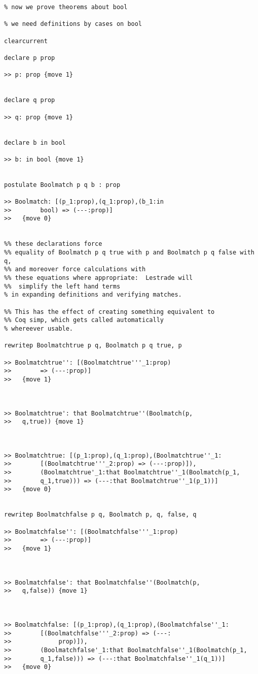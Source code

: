 \documentclass[12pt]{article}
\begin{document}
\begin{verbatim}
% now we prove theorems about bool

% we need definitions by cases on bool

clearcurrent

declare p prop

>> p: prop {move 1}


declare q prop

>> q: prop {move 1}


declare b in bool

>> b: in bool {move 1}


postulate Boolmatch p q b : prop

>> Boolmatch: [(p_1:prop),(q_1:prop),(b_1:in 
>>        bool) => (---:prop)]
>>   {move 0}


%% these declarations force 
%% equality of Boolmatch p q true with p and Boolmatch p q false with q,
%% and moreover force calculations with 
%% these equations where appropriate:  Lestrade will
%%  simplify the left hand terms
% in expanding definitions and verifying matches.

%% This has the effect of creating something equivalent to 
%% Coq simp, which gets called automatically
% whereever usable.

rewritep Boolmatchtrue p q, Boolmatch p q true, p

>> Boolmatchtrue'': [(Boolmatchtrue'''_1:prop) 
>>        => (---:prop)]
>>   {move 1}



>> Boolmatchtrue': that Boolmatchtrue''(Boolmatch(p,
>>   q,true)) {move 1}



>> Boolmatchtrue: [(p_1:prop),(q_1:prop),(Boolmatchtrue''_1:
>>        [(Boolmatchtrue'''_2:prop) => (---:prop)]),
>>        (Boolmatchtrue'_1:that Boolmatchtrue''_1(Boolmatch(p_1,
>>        q_1,true))) => (---:that Boolmatchtrue''_1(p_1))]
>>   {move 0}


rewritep Boolmatchfalse p q, Boolmatch p, q, false, q

>> Boolmatchfalse'': [(Boolmatchfalse'''_1:prop) 
>>        => (---:prop)]
>>   {move 1}



>> Boolmatchfalse': that Boolmatchfalse''(Boolmatch(p,
>>   q,false)) {move 1}



>> Boolmatchfalse: [(p_1:prop),(q_1:prop),(Boolmatchfalse''_1:
>>        [(Boolmatchfalse'''_2:prop) => (---:
>>             prop)]),
>>        (Boolmatchfalse'_1:that Boolmatchfalse''_1(Boolmatch(p_1,
>>        q_1,false))) => (---:that Boolmatchfalse''_1(q_1))]
>>   {move 0}



\end{verbatim}
\end{document}
